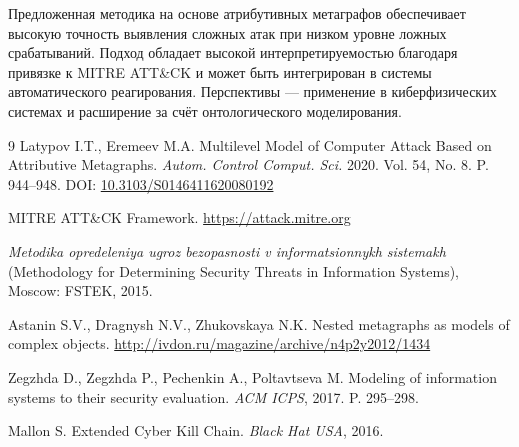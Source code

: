 \documentclass[12pt,a4paper]{article}
\begin{document}
Предложенная методика на основе атрибутивных метаграфов обеспечивает высокую точность выявления сложных атак при низком уровне ложных срабатываний. Подход обладает высокой интерпретируемостью благодаря привязке к MITRE ATT\&CK и может быть интегрирован в системы автоматического реагирования. Перспективы — применение в киберфизических системах и расширение за счёт онтологического моделирования.

\begin{thebibliography}{9}
 Latypov I.T., Eremeev M.A. Multilevel Model of Computer Attack Based on Attributive Metagraphs. \textit{Autom. Control Comput. Sci.} 2020. Vol. 54, No. 8. P. 944–948. DOI: \url{10.3103/S0146411620080192}

 MITRE ATT\&CK Framework. \url{https://attack.mitre.org}

 \textit{Metodika opredeleniya ugroz bezopasnosti v informatsionnykh sistemakh} (Methodology for Determining Security Threats in Information Systems), Moscow: FSTEK, 2015.

 Astanin S.V., Dragnysh N.V., Zhukovskaya N.K. Nested metagraphs as models of complex objects. \url{http://ivdon.ru/magazine/archive/n4p2y2012/1434}

 Zegzhda D., Zegzhda P., Pechenkin A., Poltavtseva M. Modeling of information systems to their security evaluation. \textit{ACM ICPS}, 2017. P. 295–298.

 Mallon S. Extended Cyber Kill Chain. \textit{Black Hat USA}, 2016.
\end{thebibliography}
\end{document}
